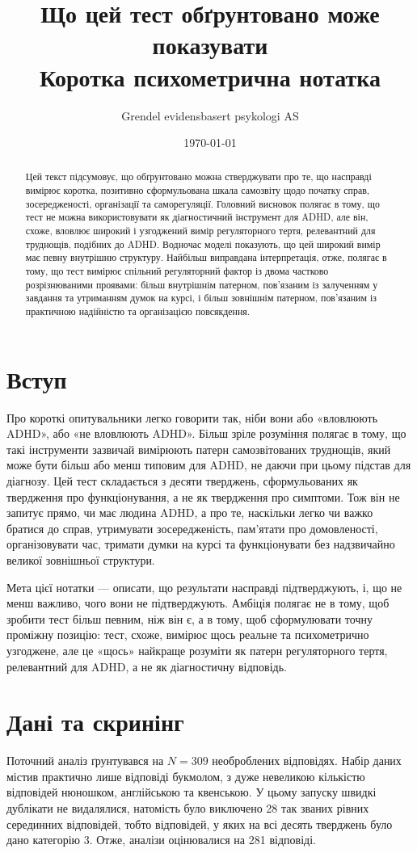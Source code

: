 \documentclass[11pt,a4paper]{article}
\title{Що цей тест обґрунтовано може показувати\\
\large Коротка психометрична нотатка}
\author{Grendel evidensbasert psykologi AS}
\date{\today}
\begin{document}
\maketitle

\begin{abstract}
Цей текст підсумовує, що обґрунтовано можна стверджувати про те, що насправді вимірює коротка, позитивно сформульована шкала самозвіту щодо початку справ, зосередженості, організації та саморегуляції. Головний висновок полягає в тому, що тест не можна використовувати як діагностичний інструмент для ADHD, але він, схоже, вловлює широкий і узгоджений вимір регуляторного тертя, релевантний для труднощів, подібних до ADHD. Водночас моделі показують, що цей широкий вимір має певну внутрішню структуру. Найбільш виправдана інтерпретація, отже, полягає в тому, що тест вимірює спільний регуляторний фактор із двома частково розрізнюваними проявами: більш внутрішнім патерном, пов'язаним із залученням у завдання та утриманням думок на курсі, і більш зовнішнім патерном, пов'язаним із практичною надійністю та організацією повсякдення.
\end{abstract}

\section{Вступ}
Про короткі опитувальники легко говорити так, ніби вони або «вловлюють ADHD», або «не вловлюють ADHD». Більш зріле розуміння полягає в тому, що такі інструменти зазвичай вимірюють патерн самозвітованих труднощів, який може бути більш або менш типовим для ADHD, не даючи при цьому підстав для діагнозу. Цей тест складається з десяти тверджень, сформульованих як твердження про функціонування, а не як твердження про симптоми. Тож він не запитує прямо, чи має людина ADHD, а про те, наскільки легко чи важко братися до справ, утримувати зосередженість, пам'ятати про домовленості, організовувати час, тримати думки на курсі та функціонувати без надзвичайно великої зовнішньої структури.

Мета цієї нотатки --- описати, що результати насправді підтверджують, і, що не менш важливо, чого вони не підтверджують. Амбіція полягає не в тому, щоб зробити тест більш певним, ніж він є, а в тому, щоб сформулювати точну проміжну позицію: тест, схоже, вимірює щось реальне та психометрично узгоджене, але це «щось» найкраще розуміти як патерн регуляторного тертя, релевантний для ADHD, а не як діагностичну відповідь.

\section{Дані та скринінг}
Поточний аналіз ґрунтувався на $N = 309$ необроблених відповідях. Набір даних містив практично лише відповіді букмолом, з дуже невеликою кількістю відповідей нюношком, англійською та квенською. У цьому запуску швидкі дублікати не видалялися, натомість було виключено 28 так званих рівних серединних відповідей, тобто відповідей, у яких на всі десять тверджень було дано категорію 3. Отже, аналізи оцінювалися на 281 відповіді.
\end{document}
